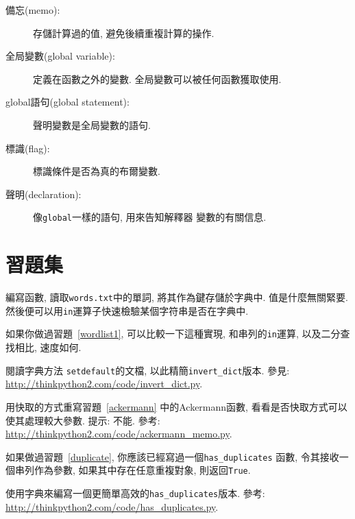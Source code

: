 \documentclass[10pt]{book}
\begin{document}
\begin{description}
\item[備忘(memo):] 存儲計算過的值, 避免後續重複計算的操作. 

\item[全局變數(global variable):] 定義在函數之外的變數. 
全局變數可以被任何函數獲取使用. 

\item[global語句(global statement):] 聲明變數是全局變數的語句.

\item[標識(flag):] 標識條件是否為真的布爾變數. 

\item[聲明(declaration):] 像{\tt global}一樣的語句, 用來告知解釋器
變數的有關信息. 

\end{description}


\section{習題集}

\begin{exercise}
\label{wordlist2}

編寫函數, 讀取{\tt words.txt}中的單詞, 
將其作為鍵存儲於字典中. 值是什麼無關緊要. 
然後便可以用{\tt in}運算子快速檢驗某個字符串是否在字典中. 

如果你做過習題~\ref{wordlist1}, 可以比較一下這種實現, 和串列的{\tt in}運算, 
以及二分查找相比, 速度如何. 

\end{exercise}


\begin{exercise}
\label{setdefault}
閱讀字典方法 {\tt setdefault}的文檔, 
以此精簡\verb"invert_dict"版本. 
參見: \url{http://thinkpython2.com/code/invert_dict.py}.

\end{exercise}


\begin{exercise}
用快取的方式重寫習題~\ref{ackermann} 中的Ackermann函數, 
看看是否快取方式可以使其處理較大參數. 
提示: 不能.
參考: \url{http://thinkpython2.com/code/ackermann_memo.py}.

\end{exercise}


\begin{exercise}
如果做過習題~\ref{duplicate}, 你應該已經寫過一個\verb"has_duplicates" 函數, 
令其接收一個串列作為參數, 如果其中存在任意重複對象, 則返回{\tt True}.

使用字典來編寫一個更簡單高效的\verb"has_duplicates"版本. 
參考: \url{http://thinkpython2.com/code/has_duplicates.py}.
\end{exercise}
\end{document}
